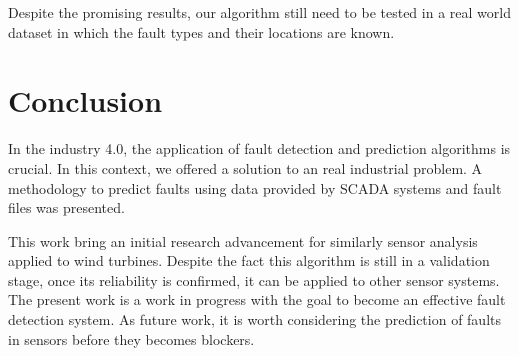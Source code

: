 \documentclass[conference]{IEEEtran}
\begin{document}
Despite the promising results, our algorithm still need to be tested in a real world dataset in which the fault types and their locations are known.

\section{Conclusion}\label{sec:conclusion}

In the industry 4.0, the application of fault detection and prediction algorithms is crucial. In this context, we offered a solution to an real industrial problem. A methodology to predict faults using data provided by SCADA systems and fault files was presented. 

This work bring an initial research advancement for similarly sensor analysis applied to wind turbines. Despite the fact this algorithm is still in a validation stage, once its reliability is confirmed, it can be applied to other sensor systems. The present work is a work in progress with the goal to become an effective fault detection system.
As future work, it is worth considering the prediction of faults in sensors before they becomes blockers.



\end{document}
